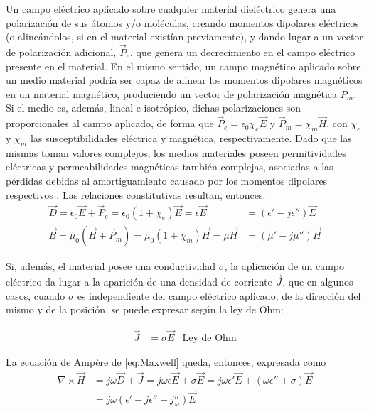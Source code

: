 Un campo eléctrico aplicado sobre cualquier material dieléctrico genera una polarización de sus átomos y/o moléculas, creando momentos dipolares eléctricos (o alineándolos, si en el material existían previamente), y dando lugar a un vector de polarización adicional, $\vec{P}_e$, que genera un decrecimiento en el campo eléctrico presente en el material. En el mismo sentido, un campo magnético aplicado sobre un medio material podría ser capaz de alinear los momentos dipolares magnéticos en un material magnético, produciendo un vector de polarización magnética $P_m$. Si el medio es, además, lineal e isotrópico, dichas polarizaciones son proporcionales al campo aplicado, de forma que $\vec{P}_e = \epsilon_0 \chi_e \vec{E}$ y $\vec{P}_m = \chi_m \vec{H}$, con $\chi_e$ y $\chi_m$ las susceptibilidades eléctrica y magnética, respectivamente. Dado que las mismas toman valores complejos, los medios materiales poseen permitividades eléctricas y permeabilidades magnéticas también complejas, asociadas a las pérdidas debidas al amortiguamiento causado por los momentos dipolares respectivos \cite{Fernandez:Electromag}. Las relaciones constitutivas resultan, entonces:
\begin{subequations}
	\label{eq:polarization_vector}
	\begin{align}
		\vec{D} = \epsilon_0 \vec{E} + \vec{P}_e = \epsilon_0 (1+\chi_e)\vec{E} = \epsilon \vec{E} &= (\epsilon' - j \epsilon'') \vec{E}\\
		\vec{B} = \mu_0 (\vec{H} + \vec{P}_m) = \mu_0 (1+\chi_m)\vec{H} = \mu \vec{H} &= (\mu' - j \mu'') \vec{H}
	\end{align}
\end{subequations}

Si, además, el material posee una conductividad $\sigma$, la aplicación de un campo eléctrico da lugar a la aparición de una densidad de corriente $\vec{J}$, que en algunos casos, cuando $\sigma$ es independiente del campo eléctrico aplicado, de la dirección del mismo y de la posición, se puede expresar según la ley de Ohm:

\begin{align}
	\label{eq:ohms_law}
	\vec{J} &= \sigma \vec{E} & \text{Ley de Ohm}
\end{align}

La ecuación de Ampère de \ref{eq:Maxwell} queda, entonces, expresada como
\begin{subequations}
	\begin{align}
		\nabla \times \vec{H} & = j \omega \vec{D} + \vec{J} = j \omega \epsilon \vec{E} + \sigma \vec{E} = j \omega \epsilon' \vec{E} + (\omega \epsilon'' + \sigma)\vec{E}\\
		& = j \omega \left( \epsilon' - j\epsilon'' - j \frac{\sigma}{\omega} \right) \vec{E}
	\end{align}
\end{subequations}

